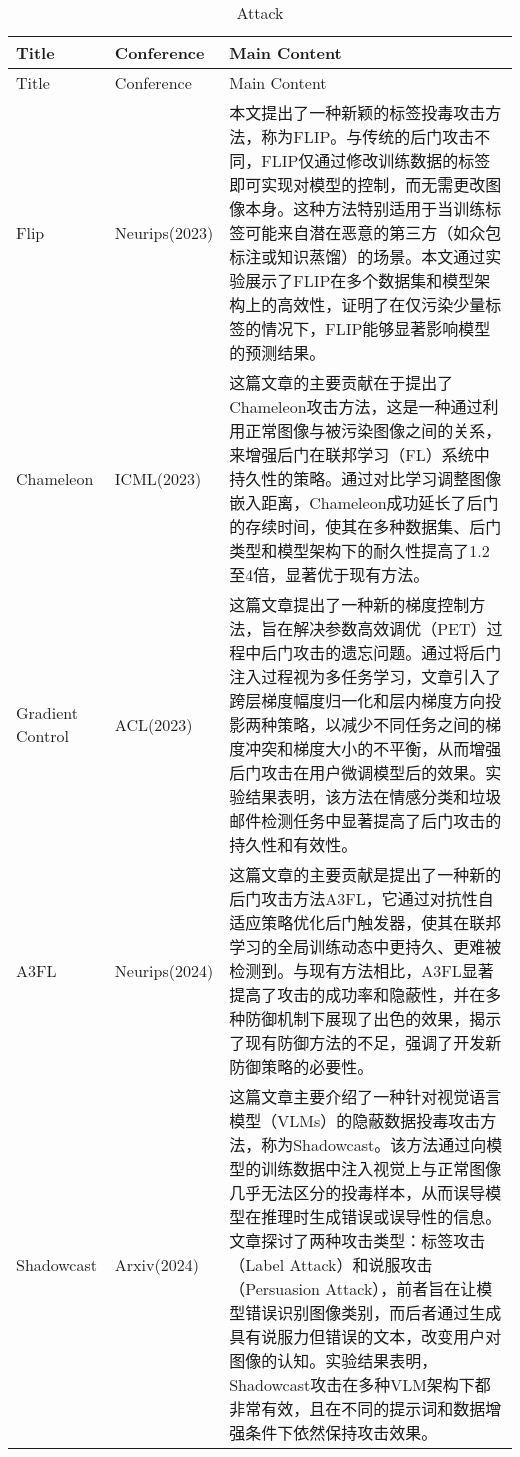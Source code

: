 \documentclass[lettersize,journal]{IEEEtran}
\begin{document}
\onecolumn
\begin{longtable}{|p{3.5cm}|p{2cm}|p{10.5cm}|} 
    \caption{Attack}
    \label{table:attack} \\ \hline
    Title & Conference & Main Content \\ \hline
    \endfirsthead \hline
    Title & Conference & Main Content \\ \hline 
    \endhead \hline
   Flip\cite{jha2023label} & Neurips(2023) &  本文提出了一种新颖的标签投毒攻击方法，称为FLIP。与传统的后门攻击不同，FLIP仅通过修改训练数据的标签即可实现对模型的控制，而无需更改图像本身。这种方法特别适用于当训练标签可能来自潜在恶意的第三方（如众包标注或知识蒸馏）的场景。本文通过实验展示了FLIP在多个数据集和模型架构上的高效性，证明了在仅污染少量标签的情况下，FLIP能够显著影响模型的预测结果。 \\ \hline
   Chameleon\cite{dai2023chameleon} & ICML(2023) & 这篇文章的主要贡献在于提出了Chameleon攻击方法，这是一种通过利用正常图像与被污染图像之间的关系，来增强后门在联邦学习（FL）系统中持久性的策略。通过对比学习调整图像嵌入距离，Chameleon成功延长了后门的存续时间，使其在多种数据集、后门类型和模型架构下的耐久性提高了1.2至4倍，显著优于现有方法。 \\ \hline
   Gradient Control\cite{gu2023gradient} & ACL(2023) & 这篇文章提出了一种新的梯度控制方法，旨在解决参数高效调优（PET）过程中后门攻击的遗忘问题。通过将后门注入过程视为多任务学习，文章引入了跨层梯度幅度归一化和层内梯度方向投影两种策略，以减少不同任务之间的梯度冲突和梯度大小的不平衡，从而增强后门攻击在用户微调模型后的效果。实验结果表明，该方法在情感分类和垃圾邮件检测任务中显著提高了后门攻击的持久性和有效性。 \\ \hline
   A3FL\cite{zhang2024a3fl} & Neurips(2024) & 这篇文章的主要贡献是提出了一种新的后门攻击方法A3FL，它通过对抗性自适应策略优化后门触发器，使其在联邦学习的全局训练动态中更持久、更难被检测到。与现有方法相比，A3FL显著提高了攻击的成功率和隐蔽性，并在多种防御机制下展现了出色的效果，揭示了现有防御方法的不足，强调了开发新防御策略的必要性。\\ \hline
   Shadowcast\cite{xu2024shadowcast} & Arxiv(2024) & 这篇文章主要介绍了一种针对视觉语言模型（VLMs）的隐蔽数据投毒攻击方法，称为Shadowcast。该方法通过向模型的训练数据中注入视觉上与正常图像几乎无法区分的投毒样本，从而误导模型在推理时生成错误或误导性的信息。文章探讨了两种攻击类型：标签攻击（Label Attack）和说服攻击（Persuasion Attack），前者旨在让模型错误识别图像类别，而后者通过生成具有说服力但错误的文本，改变用户对图像的认知。实验结果表明，Shadowcast攻击在多种VLM架构下都非常有效，且在不同的提示词和数据增强条件下依然保持攻击效果。\\ \hline

\end{longtable}
\end{document}
